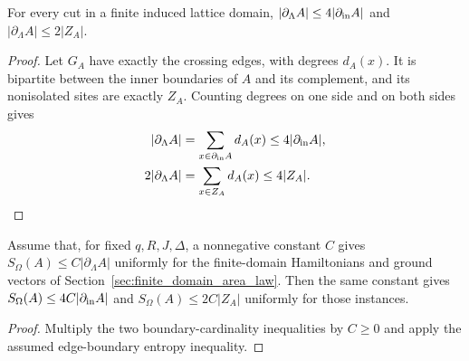 \begin{lemma}
    \label{thm:area_law_vertex_boundary_counts}
    \leanok
    For every cut in a finite induced lattice domain,
    $|\partial_\Lambda A|\le4|\partial_{\rm in}A|$ and
    $|\partial_\Lambda A|\le2|Z_A|$.
\end{lemma}
\begin{proof}\leanok
    Let $G_A$ have exactly the crossing edges, with degrees $d_A(x)$.
    It is bipartite between the inner boundaries of $A$ and its complement,
    and its nonisolated sites are exactly $Z_A$.
    Counting degrees on one side and on both sides gives
    \begin{align}
        |\partial_\Lambda A|
         & =\sum_{x\in\partial_{\rm in}A}d_A(x)
        \le4|\partial_{\rm in}A|,               \\
        2|\partial_\Lambda A|
         & =\sum_{x\in Z_A}d_A(x)\le4|Z_A|.
    \end{align}
\end{proof}

\begin{lemma}
    \label{thm:area_law_conditional_vertex_bounds}
    \leanok
    Assume that, for fixed $q,R,J,\Delta$, a nonnegative constant $C$ gives
    $S_\Omega(A)\le C|\partial_\Lambda A|$ uniformly for the finite-domain
    Hamiltonians and ground vectors of Section~\ref{sec:finite_domain_area_law}.
    Then the same constant gives
    $S_\Omega(A)\le4C|\partial_{\rm in}A|$ and
    $S_\Omega(A)\le2C|Z_A|$ uniformly for those instances.
\end{lemma}
\begin{proof}\leanok
    Multiply the two boundary-cardinality inequalities by $C\ge0$ and apply
    the assumed edge-boundary entropy inequality.
\end{proof}
